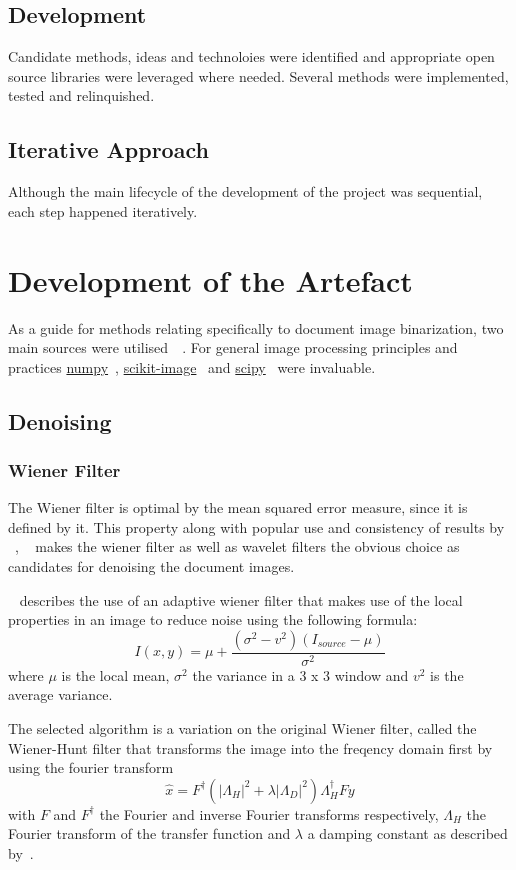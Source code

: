 \documentclass[a4paper]{article}
\begin{document}
\begin{multicols}{2}
    \subsection{Development}
    Candidate methods, ideas and technoloies were identified and appropriate open source libraries were leveraged where needed. Several methods were implemented, tested and relinquished.

    \subsection{Iterative Approach}
    Although the main lifecycle of the development of the project was sequential, each step happened iteratively.

    \section{Development of the Artefact}
    As a guide for methods relating specifically to document image binarization, two main sources were utilised~\cite{su2012robust}~\cite{gatos2006adaptive}. For general image processing principles and practices \href{https://numpy.org/}{numpy}~\cite{numpy},
    \href{https://scikit-image.org/}{scikit-image}~\cite{scikit-image} and
    \href{https://scikit-image.org/}{scipy}~\cite{2020SciPy-NMeth} were invaluable.

    \subsection{Denoising}
    \subsubsection{Wiener Filter}
    The Wiener filter is optimal by the mean squared error measure, since it is defined by it. This property along with popular use and consistency of results by ~\cite{6524379}, ~\cite{gatos2006adaptive} makes the wiener filter as well as wavelet filters the obvious choice as candidates for denoising the document images.
    \par
    ~\cite{gatos2006adaptive} describes the use of an adaptive wiener filter that makes use of the local properties in an image to reduce noise using the following formula:
    \[I(x,y)=\mu+\frac{(\sigma^2-v^2)(I_{source}-\mu)}{\sigma^2}\]
    where \(\mu\) is the local mean, \(\sigma^2\) the variance in a 3 x 3 window and \(v^2\) is the average variance.
    \par
    The selected algorithm is a variation on the original Wiener filter, called the Wiener-Hunt filter that transforms the image into the freqency domain first by using the fourier transform
    \[\hat x = F^\dagger (|\Lambda_H|^2 + \lambda |\Lambda_D|^2)
        \Lambda_H^\dagger F y\]
    with \(F\) and \(F^\dagger\) the Fourier and inverse Fourier transforms respectively, \(\Lambda_H\) the Fourier transform of the transfer function and \(\lambda\) a damping constant as described by~\cite{scikit-image}.


\end{multicols}
\end{document}
